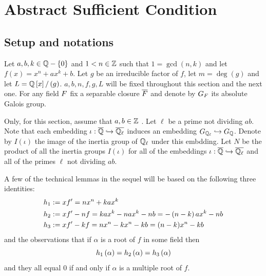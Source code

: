 \documentclass[../main.tex]{subfiles}
\begin{document}
\section{Abstract Sufficient Condition }
\subsection{Setup and notations \label{subsection:strategy_setup}}
Let $a, b, k \in \mathbb{Q} - \left\{ 0 \right\}$ and $1 < n \in \mathbb{Z}$ such that $1 = \gcd\left( n, k \right)$ and let $f\left( x \right) = x^n + ax^k + b$.
Let $g$ be an irreducible factor of $f$, let $m = \deg \left( g \right)$ and let $L = \mathbb{Q}\left[ x \right] / \left( g \right)$.
$a,b,n,f,g,L$ will be fixed throughout this section and the next one.
For any field $F$ fix a separable closure $\overline{F}$ and denote by $G_F$ its absolute Galois group.

Only, for this section, assume that $a,b \in \mathbb{Z}$ \editorial{}.
Let $\ell$ be a prime not dividing $ab$.
Note that each embedding $\iota: \overline{\mathbb{Q}} \hookrightarrow \overline{\mathbb{Q}_\ell}$ induces an embedding $G_{\mathbb{Q}_\ell} \hookrightarrow G_{\mathbb{Q}}$.
Denote by $I\left( \iota \right)$ the image of the inertia group of $\mathbb{Q}_\ell$ under this embdding.
Let $N$ be the product of all the inertia groups $I\left( \iota \right)$ for all of the embeddings $\iota: \overline{\mathbb{Q}} \hookrightarrow \overline{\mathbb{Q}_\ell}$ and all of the primes $\ell$ not dividing $ab$.

A few of the technical lemmas in the sequel will be based on the following three identities:
\begin{align*}
  & h_{1} := xf' = nx^{n} + kax^{k}
    \\
  & h_{2} := xf' - nf = kax^k - nax^k - nb = -\left( n-k \right)ax^k - nb 
  \\
  & h_{3} := xf' - kf = nx^n - kx^n - kb = (n - k)x^n - kb 
\end{align*}
and the observations that if $\alpha$ is a root of $f$ in some field then 
\[
  h_{1}\left( \alpha \right) = h_{2}\left( \alpha \right) = h_{3}\left( \alpha \right)
\]
and they all equal $0$ if and only if $\alpha$ is a multiple root of $f$.
\end{document}
